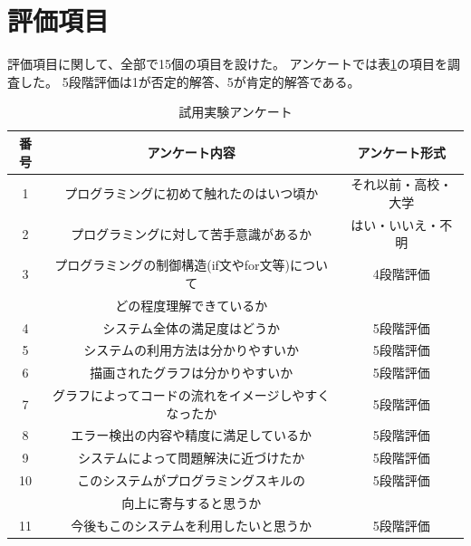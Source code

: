 \documentclass{cssspaper}
\begin{document}
        \section{評価項目}
        評価項目に関して、全部で15個の項目を設けた。
        アンケートでは表\ref{table:question}の項目を調査した。
        5段階評価は1が否定的解答、5が肯定的解答である。
        \begin{table}[h]
            \caption{試用実験アンケート}
            \label{table:question}
            \centering
            \begin{tabular}{ccc}
              \hline
              番号 & アンケート内容                             & アンケート形式 \\
              \hline \hline
              1    & プログラミングに初めて触れたのはいつ頃か     & それ以前・高校・大学 \\
              \hline
              2    & プログラミングに対して苦手意識があるか       & はい・いいえ・不明 \\
              \hline
              3    & プログラミングの制御構造(if文やfor文等)について   & 4段階評価      \\
                   & どの程度理解できているか                    &              \\
              \hline
              4    & システム全体の満足度はどうか                & 5段階評価        \\
              \hline
              5    & システムの利用方法は分かりやすいか           & 5段階評価        \\
              \hline
              6    & 描画されたグラフは分かりやすいか             & 5段階評価        \\
              \hline
              7    & グラフによってコードの流れをイメージしやすくなったか & 5段階評価        \\
              \hline
              8    & エラー検出の内容や精度に満足しているか        & 5段階評価        \\
              \hline
              9    & システムによって問題解決に近づけたか          & 5段階評価        \\
              \hline
              10    & このシステムがプログラミングスキルの          & 5段階評価        \\
                    & 向上に寄与すると思うか                       &              \\
              \hline
              11    & 今後もこのシステムを利用したいと思うか          & 5段階評価        \\

\end{tabular}
\end{table}
\end{document}
